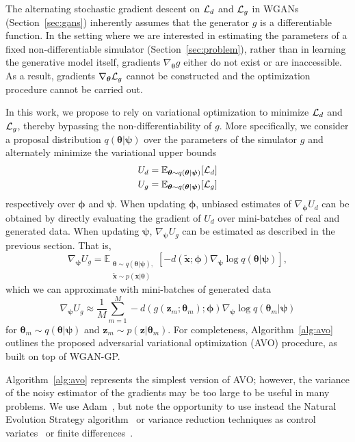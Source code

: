 \documentclass{article}
\newcommand{\bftheta}{{\bm \theta}}
\newcommand{\bfpsi}{{\bm \psi}}
\newcommand{\bfphi}{{\bm \phi}}
\newcommand{\bfx}{\mathbf{x}}
\newcommand{\bfz}{\mathbf{z}}
\theoremstyle{plain}
\begin{document}
The alternating stochastic gradient descent on ${\cal L}_d$ and ${\cal L}_g$ in
WGANs (Section~\ref{sec:gans}) inherently assumes that the generator $g$ is a differentiable function. In
the setting where we are interested in estimating the parameters of a
fixed non-differentiable simulator (Section~\ref{sec:problem}),
rather than in learning the generative model itself,
gradients $\nabla_\bftheta g$ either do not exist or are inaccessible. As a
result, gradients $\nabla_\bftheta {\cal L}_g$ cannot be constructed and the
optimization procedure cannot be carried out.

In this work, we propose to rely on variational optimization to minimize ${\cal
L}_d$ and ${\cal L}_g$, thereby bypassing the non-differentiability of $g$. More
specifically, we consider a proposal distribution $q(\bftheta|\bfpsi)$ over the
parameters of the simulator $g$ and alternately minimize the variational upper bounds
\begin{align}
U_d &= \mathbb{E}_{\bftheta \sim q(\bftheta|\bfpsi)} [ {\cal L}_d ] \label{eqn:vo-ud} \\
U_g &= \mathbb{E}_{\bftheta \sim q(\bftheta|\bfpsi)} [ {\cal L}_g ] \label{eqn:vo-ug}
\end{align} respectively over $\bfphi$ and $\bfpsi$.
When updating
$\bfphi$, unbiased estimates of $\nabla_\bfphi U_d$ can be obtained by
directly evaluating the gradient of $U_d$ over mini-batches of real and
generated data. When updating
$\bfpsi$, $\nabla_\bfpsi U_g$ can be estimated as described in the previous section.
That is,
\begin{equation}\label{eqn:grad-ug-approx}
\nabla_\bfpsi U_g = \mathbb{E}_{\substack{\bftheta \sim q(\bftheta|\bfpsi), \\ \tilde{\bfx} \sim p(\bfx | \bftheta)}}  [-d( \tilde{\bfx} ;\bfphi) \nabla_\bfpsi \log q(\bftheta|\bfpsi)],
\end{equation}
which we can approximate with mini-batches of
generated data
\begin{equation}
\nabla_\bfpsi U_g \approx \frac{1}{M} \sum_{m=1}^M -d(g(\bfz_m; \bftheta_m); \bfphi) \nabla_\bfpsi \log q(\bftheta_m|\bfpsi)
\end{equation}
for $\bftheta_m \sim q(\bftheta|\bfpsi)$ and $\bfz_m \sim p(\bfz|\bftheta_m)$.
For completeness, Algorithm~\ref{alg:avo} outlines the proposed adversarial variational
optimization (AVO) procedure, as built on top of WGAN-GP.

Algorithm~\ref{alg:avo} represents the simplest version of AVO; however, the
variance of the noisy estimator of the gradients may be too large to be useful in many problems.
We use Adam~\cite{2014arXiv1412.6980K}, but note the opportunity to use instead the Natural Evolution Strategy
algorithm~\cite{2011arXiv1106.4487W} or variance reduction techniques as
control variates~\cite{2017arXiv171100123G} or finite differences~\cite{buesingstochastic}.
\end{document}
